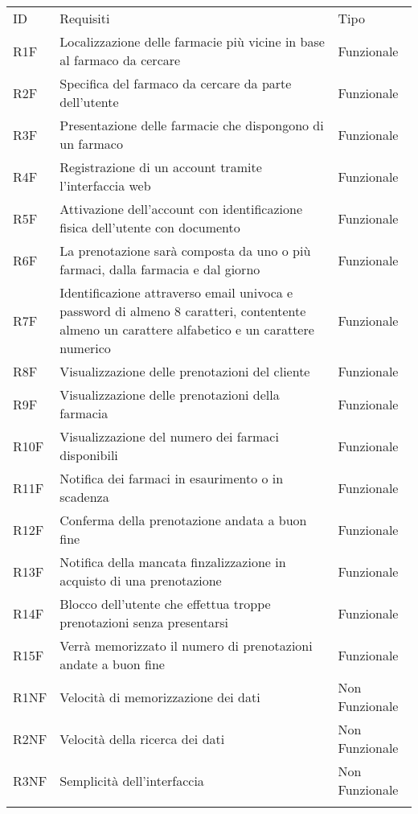 \begin{longtable}[c]{@{}lll@{}}
\toprule\addlinespace
ID & Requisiti & Tipo
\\\addlinespace
\midrule\endhead
R1F & Localizzazione delle farmacie più vicine in base al farmaco da
cercare & Funzionale
\\\addlinespace
R2F & Specifica del farmaco da cercare da parte dell'utente & Funzionale
\\\addlinespace
R3F & Presentazione delle farmacie che dispongono di un farmaco &
Funzionale
\\\addlinespace
R4F & Registrazione di un account tramite l'interfaccia web & Funzionale
\\\addlinespace
R5F & Attivazione dell'account con identificazione fisica dell'utente
con documento & Funzionale
\\\addlinespace
R6F & La prenotazione sarà composta da uno o più farmaci, dalla farmacia
e dal giorno & Funzionale
\\\addlinespace
R7F & Identificazione attraverso email univoca e password di almeno 8
caratteri, contentente almeno un carattere alfabetico e un carattere
numerico & Funzionale
\\\addlinespace
R8F & Visualizzazione delle prenotazioni del cliente & Funzionale
\\\addlinespace
R9F & Visualizzazione delle prenotazioni della farmacia & Funzionale
\\\addlinespace
R10F & Visualizzazione del numero dei farmaci disponibili & Funzionale
\\\addlinespace
R11F & Notifica dei farmaci in esaurimento o in scadenza & Funzionale
\\\addlinespace
R12F & Conferma della prenotazione andata a buon fine & Funzionale
\\\addlinespace
R13F & Notifica della mancata finzalizzazione in acquisto di una
prenotazione & Funzionale
\\\addlinespace
R14F & Blocco dell'utente che effettua troppe prenotazioni senza
presentarsi & Funzionale
\\\addlinespace
R15F & Verrà memorizzato il numero di prenotazioni andate a buon fine &
Funzionale
\\\addlinespace
R1NF & Velocità di memorizzazione dei dati & Non Funzionale
\\\addlinespace
R2NF & Velocità della ricerca dei dati & Non Funzionale
\\\addlinespace
R3NF & Semplicità dell'interfaccia & Non Funzionale
\\\addlinespace

\end{longtable}
